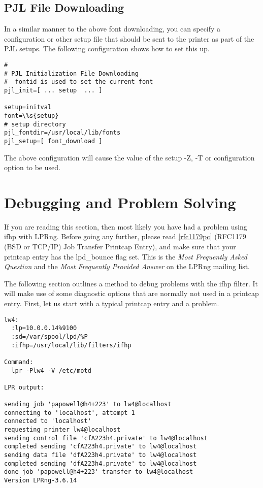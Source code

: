 \documentclass[a4paper]{article}
\begin{document}
\subsection{PJL File Downloading}

In a similar manner to the above font downloading,
you can specify a configuration or other setup file that should be
sent to the printer as part of the PJL setups.
The following configuration shows how to set this up.
\begin{tscreen}
\begin{verbatim}
#
# PJL Initialization File Downloading
#  fontid is used to set the current font
pjl_init=[ ... setup  ... ]

setup=initval
font=\%s{setup}
# setup directory
pjl_fontdir=/usr/local/lib/fonts
pjl_setup=[ font_download ]
\end{verbatim}
\end{tscreen}


The above configuration will cause the value of the
{\ttfamily setup}
{\ttfamily -Z},
{\ttfamily -T}
or configuration option to be used.


\section{Debugging and Problem Solving}

If you are reading this section,
then most likely you have had a problem using {\ttfamily ifhp} with LPRng.
Before going any further,
please read 
\ref{rfc1179pc} {(RFC1179 (BSD or TCP/IP) Job Transfer Printcap Entry)},
and make sure that your printcap entry has the
{\ttfamily lpd\_bounce} flag set.
This is the {\itshape Most Frequently Asked Question\/} and the
{\itshape Most Frequently Provided Answer\/} on the LPRng mailing list.

The following section outlines a method to debug problems with the
{\ttfamily ifhp} filter.
It will make use of some {\ttfamily diagnostic} options that are normally
not used in a printcap entry.
First,
let us start with a typical printcap entry and a problem.
\begin{tscreen}
\begin{verbatim}
lw4:
  :lp=10.0.0.14%9100
  :sd=/var/spool/lpd/%P
  :ifhp=/usr/local/lib/filters/ifhp

Command:
  lpr -Plw4 -V /etc/motd

LPR output:

sending job 'papowell@h4+223' to lw4@localhost
connecting to 'localhost', attempt 1
connected to 'localhost'
requesting printer lw4@localhost
sending control file 'cfA223h4.private' to lw4@localhost
completed sending 'cfA223h4.private' to lw4@localhost
sending data file 'dfA223h4.private' to lw4@localhost
completed sending 'dfA223h4.private' to lw4@localhost
done job 'papowell@h4+223' transfer to lw4@localhost
Version LPRng-3.6.14
\end{verbatim}
\end{tscreen}
\end{document}
